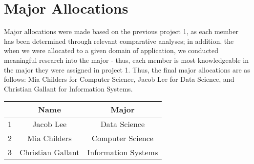 
\section{\textbf{Major Allocations}}

Major allocations were made based on the previous project 1, as each member has been determined through relevant comparative analyses; in addition, the when we were allocated to a given domain of application, we conducted meaningful research into the major - thus, each member is most knowledgeable in the major they were assigned in project 1. Thus, the final major allocations are as follows: Mia Childers for Computer Science, Jacob Lee for Data Science, and Christian Gallant for Information Systems. 

\begin{center}
    \begin{tabular}{ |c|c|c| }
        \hline
        & Name & Major \\
      \hline
      1 & Jacob Lee & Data Science\\
      \hline
      2 & Mia Childers & Computer Science\\
      \hline
      3 & Christian Gallant & Information Systems\\
      \hline
    \end{tabular}
    \end{center}